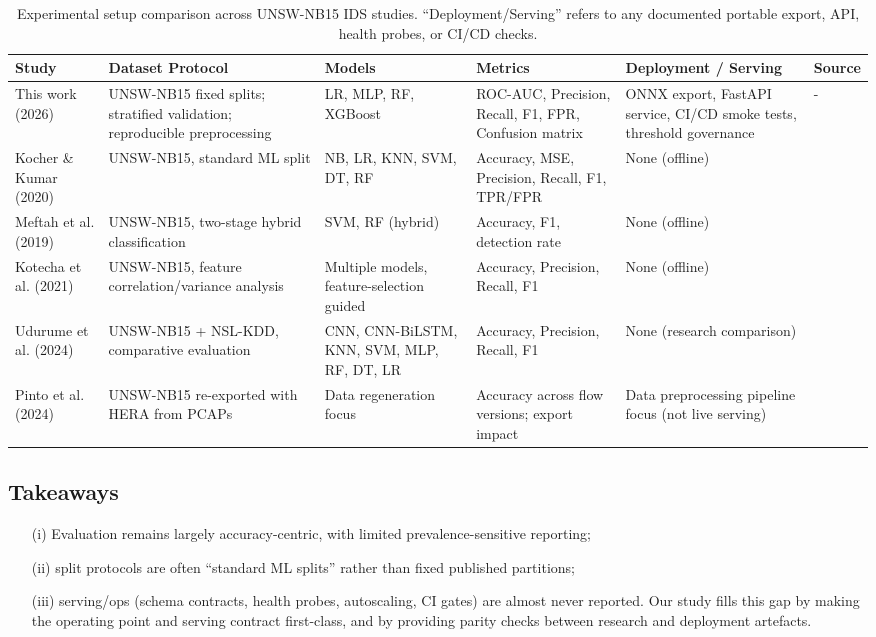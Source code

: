 \documentclass{article}
\begin{document}
\begin{table}[ht!]
\caption{Experimental setup comparison across UNSW-NB15 IDS studies. “Deployment/Serving” refers to any documented portable export, API, health probes, or CI/CD checks.}
\label{tab:comparison}
\centering
\renewcommand{\arraystretch}{1.6}
\begin{tabularx}{\textwidth}{l X X X X X}
\toprule
\textbf{Study} & \textbf{Dataset Protocol} & \textbf{Models} & \textbf{Metrics} & \textbf{Deployment / Serving} & \textbf{Source}\\
\midrule
This work (2026) & UNSW-NB15 fixed splits; stratified validation; reproducible preprocessing & LR, MLP, RF, XGBoost & ROC-AUC, Precision, Recall, F1, FPR, Confusion matrix & ONNX export, FastAPI service, CI/CD smoke tests, threshold governance & -\\
\addlinespace
Kocher \& Kumar (2020)  & UNSW-NB15, standard ML split & NB, LR, KNN, SVM, DT, RF & Accuracy, MSE, Precision, Recall, F1, TPR/FPR & None (offline) & \cite{kocher2020}\\
\addlinespace
Meftah et al. (2019)  & UNSW-NB15, two-stage hybrid classification & SVM, RF (hybrid) & Accuracy, F1, detection rate & None (offline) & \cite{meftah2019}\\
\addlinespace
Kotecha et al. (2021)  & UNSW-NB15, feature correlation/variance analysis & Multiple models, feature-selection guided & Accuracy, Precision, Recall, F1 & None (offline) & \cite{kotecha2021}\\
\addlinespace
Udurume et al. (2024)  & UNSW-NB15 + NSL-KDD, comparative evaluation & CNN, CNN-BiLSTM, KNN, SVM, MLP, RF, DT, LR & Accuracy, Precision, Recall, F1 & None (research comparison) & \cite{udurume2024}\\
\addlinespace
Pinto et al. (2024) & UNSW-NB15 re-exported with HERA from PCAPs & Data regeneration focus & Accuracy across flow versions; export impact & Data preprocessing pipeline focus (not live serving) & \cite{pinto2024}  \\
\bottomrule
\end{tabularx}
\end{table}

\subsection*{Takeaways}
\begin{itemize}
    \item[(i)] Evaluation remains largely accuracy-centric, with limited prevalence-sensitive reporting;
    \item[(ii)] split protocols are often “standard ML splits” rather than fixed published partitions;
    \item[(iii)] serving/ops (schema contracts, health probes, autoscaling, CI gates) are almost never reported. Our study fills this gap by making the operating point and serving contract first-class, and by providing parity checks between research and deployment artefacts.
\end{itemize}
\end{document}
